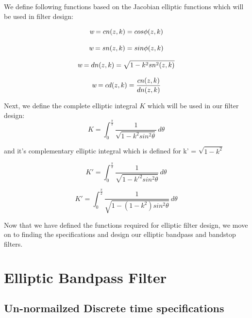 \documentclass{article}
\begin{document}
We define following functions based on the Jacobian elliptic functions which will be used in filter design:

\begin{equation}
    \emph{w} = cn(z, k) = cos \phi(z,k)
\end{equation}

\begin{equation}
    \emph{w} = sn(z, k) = sin \phi(z,k)
\end{equation}

\begin{equation}
    \emph{w} = dn(z, k) = \sqrt{1 - k^{2}sn^{2}(z,k)}
\end{equation}

\begin{equation}
    \emph{w} = cd(z, k) = \frac{cn(z,k)}{dn(z,k)}
\end{equation}

Next, we define the complete elliptic integral $K$ which will be used in our filter design:
\begin{equation}
    K = \int _{0} ^{\frac{\pi}{2}} \frac{1}{\sqrt{1-k^{2}sin^{2}\theta}} \, d\theta
\end{equation}

and it's complementary elliptic integral which is defined for k' = $\sqrt{1-k^2}$

\begin{equation}
    K' = \int _{0} ^{\frac{\pi}{2}} \frac{1}{\sqrt{1-k'^{2}sin^{2}\theta}} \, d\theta
\end{equation}

\begin{equation}
    K' = \int _{0} ^{\frac{\pi}{2}} \frac{1}{\sqrt{1-(1-k^{2})sin^{2}\theta}} \, d\theta
\end{equation}

Now that we have defined the functions required for elliptic filter design, we move on to finding the specifications and design our elliptic bandpass and bandstop filters.

\section{Elliptic Bandpass Filter}

\subsection{Un-normailzed Discrete time specifications}
\end{document}
